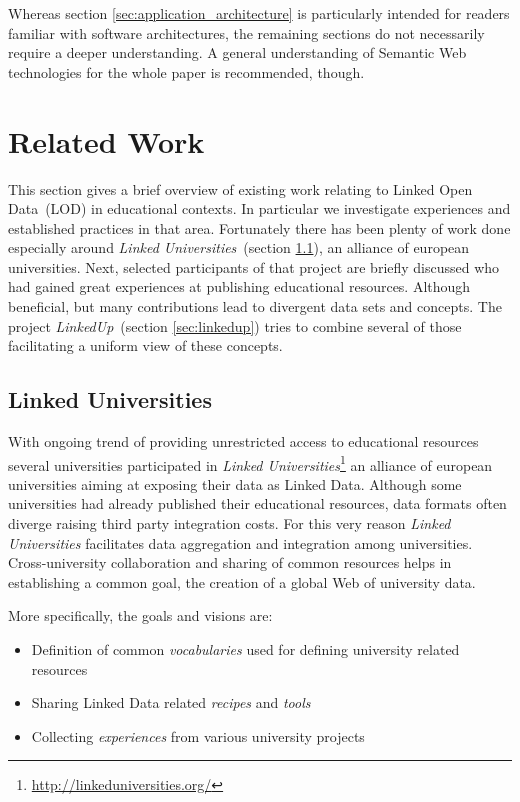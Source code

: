 \documentclass{article}
\begin{document}
Whereas section \ref{sec:application_architecture} is particularly intended for readers familiar with software architectures, the remaining sections do not necessarily require
a deeper understanding. A general understanding of Semantic Web technologies for the whole paper is recommended, though.  


\section{Related Work}
\label{sec:related_work}
This section gives a brief overview of existing work relating to Linked Open Data~(LOD) in educational contexts. In particular we investigate experiences and established practices in that area. Fortunately there has been plenty of work done especially around \textit{Linked Universities}~(section \ref{sec:linked_universities}), an alliance of european universities. Next, selected participants of that project are briefly discussed who had gained great experiences at publishing educational resources. Although beneficial, but many contributions lead to divergent data sets and concepts. The project \textit{LinkedUp}~(section \ref{sec:linkedup}) tries to combine several of those facilitating a uniform view of these concepts.

\subsection{Linked Universities}
\label{sec:linked_universities}
With ongoing trend of providing unrestricted access to educational resources several universities participated in \textit{Linked Universities}\footnote{\url{http://linkeduniversities.org/}} an alliance of european universities aiming at exposing their data as Linked Data. Although some universities had already published their educational resources, data formats often diverge raising third party integration costs. For this very reason \textit{Linked Universities} facilitates data aggregation and integration among universities. Cross-university collaboration and sharing of common resources helps in establishing a common goal, the creation of a global Web of university data. 

More specifically, the goals and visions are:
\begin{itemize}
	\item Definition of common \textit{vocabularies} used for defining university related resources
	\item Sharing Linked Data related \textit{recipes} and \textit{tools}
	\item Collecting \textit{experiences} from various university projects
\end{itemize}
\end{document}
